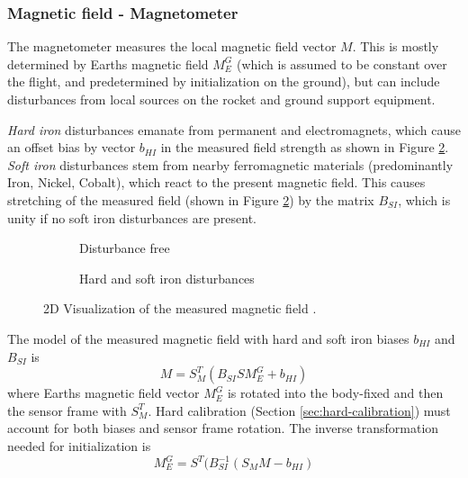 \subsubsection{Magnetic field - Magnetometer}
The magnetometer measures the local magnetic field vector $M$.
This is mostly determined by Earths magnetic field $M_E^G$ (which is assumed to be constant over the flight, and predetermined by initialization on the ground), but can include disturbances from local sources on the rocket and ground support equipment.

\textit{Hard iron} disturbances emanate from permanent and electromagnets, which cause an offset bias by vector $b_{HI}$ in the measured field strength as shown in Figure \ref{fig:meas-mag-dist}. \\
\textit{Soft iron} disturbances stem from nearby ferromagnetic materials (predominantly Iron, Nickel, Cobalt), which react to the present magnetic field. 
This causes stretching of the measured field (shown in Figure \ref{fig:meas-mag-dist}) by the matrix $B_{SI}$, which is unity if no soft iron disturbances are present.

\begin{figure}[ht!]
    \centering
    \begin{subfigure}{0.4\textwidth}
        \resizebox{0.7\textwidth}{!}{
        }
        \caption{Disturbance free}
        \label{fig:meas-mag-free}
    \end{subfigure}
    \begin{subfigure}{0.4\textwidth}
        \resizebox{0.7\textwidth}{!}{
        }
        \caption{Hard and soft iron disturbances}
        \label{fig:meas-mag-dist}
    \end{subfigure}
    \caption[2D Visualization of the measured magnetic field.]{2D Visualization of the measured magnetic field \cite{vectornav2024}.}
    \label{fig:meas-mag}
\end{figure}

The model of the measured magnetic field with hard and soft iron biases $b_{HI}$ and $B_{SI}$ is 
\begin{equation}
    M = S_M^T ( B_{SI} S M_E^G + b_{HI} ) \label{eq:meas-mag}
\end{equation}
where Earths magnetic field vector $M_E^G$ is rotated into the body-fixed and then the sensor frame with $S_M^T$.
Hard calibration (Section \ref{sec:hard-calibration}) must account for both biases and sensor frame rotation.
The inverse transformation needed for initialization is 
\begin{equation}
    M_E^G = S^T ( B_{SI}^{-1} (S_M M - b_{HI} ) \label{eq:meas-mag-init}
\end{equation}

